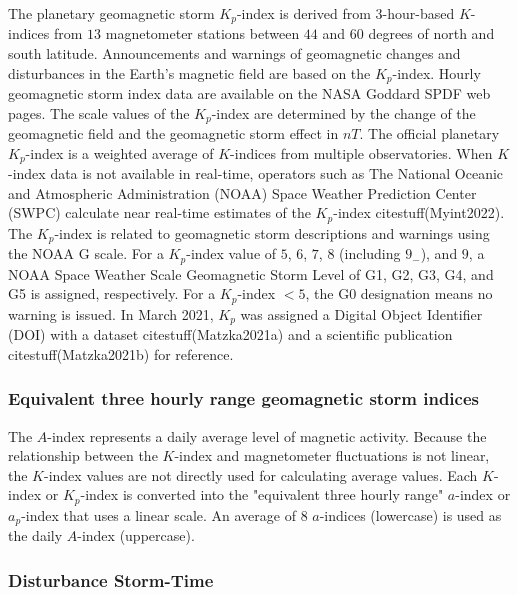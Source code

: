 \let\LaTeXcline\cline\documentclass[sn-mathphys-num]{sn-jnl}\let\cline\LaTeXcline
\begin{document}
The planetary geomagnetic storm $K_{p}$-index is derived from $3$-hour-based $K$-indices from $13$ magnetometer stations between $44$ and $60$ degrees of north and south latitude. Announcements and warnings of geomagnetic changes and disturbances in the Earth's magnetic field are based on the $K_{p}$-index. Hourly geomagnetic storm index data are available on the NASA Goddard SPDF web pages. The scale values of the $K_{p}$-index are determined by the change of the geomagnetic field and the geomagnetic storm effect in $nT$. The official planetary $K_{p}$-index is a weighted average of $K$-indices from multiple observatories. When $K$-index data is not available in real-time, operators such as The National Oceanic and Atmospheric Administration (NOAA) Space Weather Prediction Center (SWPC) calculate near real-time estimates of the $K_{p}$-index citestuff(Myint2022). The $K_{p}$-index is related to geomagnetic storm descriptions and warnings using the NOAA G scale. For a $K_{p}$-index value of $5$, $6$, $7$, $8$ (including $9_{-}$), and $9$, a NOAA Space Weather Scale Geomagnetic Storm Level of G1, G2, G3, G4, and G5 is assigned, respectively. For a $K_{p}$-index $<5$, the G0 designation means no warning is issued. In March 2021, $K_{p}$ was assigned a Digital Object Identifier (DOI) with a dataset citestuff(Matzka2021a) and a scientific publication citestuff(Matzka2021b) for reference.

\subsubsection{Equivalent three hourly range geomagnetic storm indices}

The $A$-index represents a daily average level of magnetic activity. Because the relationship between the $K$-index and magnetometer fluctuations is not linear, the $K$-index values are not directly used for calculating average values. Each $K$-index or $K_{p}$-index is converted into the "equivalent three hourly range" $a$-index or $a_{p}$-index that uses a linear scale. An average of $8$ $a$-indices (lowercase) is used as the daily $A$-index (uppercase).  

\subsubsection{Disturbance Storm-Time}
\end{document}
